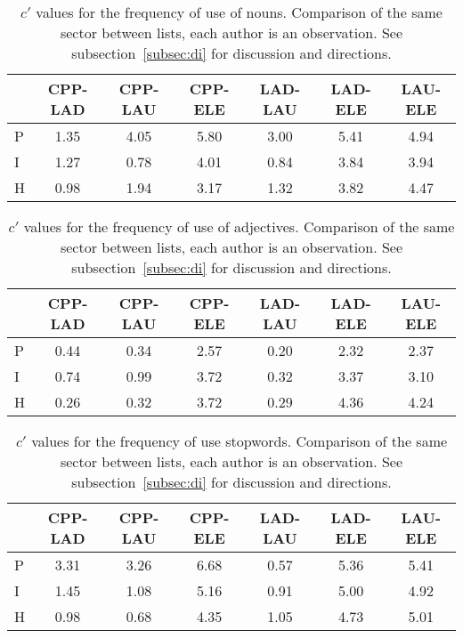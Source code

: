 \begin{table}
  \centering
  \caption{$c'$ values for the frequency of use of nouns. Comparison of the same sector between lists, each author is an observation. See subsection~\ref{subsec:di} for discussion and directions.}
  \begin{tabular}{l| c c c c c c}
& CPP-LAD & CPP-LAU & CPP-ELE & LAD-LAU & LAD-ELE & LAU-ELE \\\hline
P & 1.35 & 4.05 & 5.80 & 3.00 & 5.41 & 4.94 \\
I & 1.27 & 0.78 & 4.01 & 0.84 & 3.84 & 3.94 \\
H & 0.98 & 1.94 & 3.17 & 1.32 & 3.82 & 4.47 \\
  \end{tabular}
  \label{tab:kolSubInter}
\end{table}

\begin{table}
  \centering
  \caption{$c'$ values for the frequency of use of adjectives. Comparison of the same sector between lists, each author is an observation. See subsection~\ref{subsec:di} for discussion and directions.}
  \begin{tabular}{l| c c c c c c}
 & CPP-LAD & CPP-LAU & CPP-ELE & LAD-LAU & LAD-ELE & LAU-ELE \\\hline
P & 0.44 & 0.34 & 2.57 & 0.20 & 2.32 & 2.37 \\
I & 0.74 & 0.99 & 3.72 & 0.32 & 3.37 & 3.10 \\
H & 0.26 & 0.32 & 3.72 & 0.29 & 4.36 & 4.24 \\
  \end{tabular}
  \label{tab:kolAdjInter}
\end{table}

\begin{table}
  \centering
  \caption{$c'$ values for the frequency of use stopwords. Comparison of the same sector between lists, each author is an observation. See subsection~\ref{subsec:di} for discussion and directions.}
  \begin{tabular}{l| c c c c c c}
 & CPP-LAD & CPP-LAU & CPP-ELE & LAD-LAU & LAD-ELE & LAU-ELE \\\hline
P & 3.31 & 3.26 & 6.68 & 0.57 & 5.36 & 5.41 \\
I & 1.45 & 1.08 & 5.16 & 0.91 & 5.00 & 4.92 \\
H & 0.98 & 0.68 & 4.35 & 1.05 & 4.73 & 5.01 \\
  \end{tabular}
  \label{tab:kolSwInter}
\end{table}

